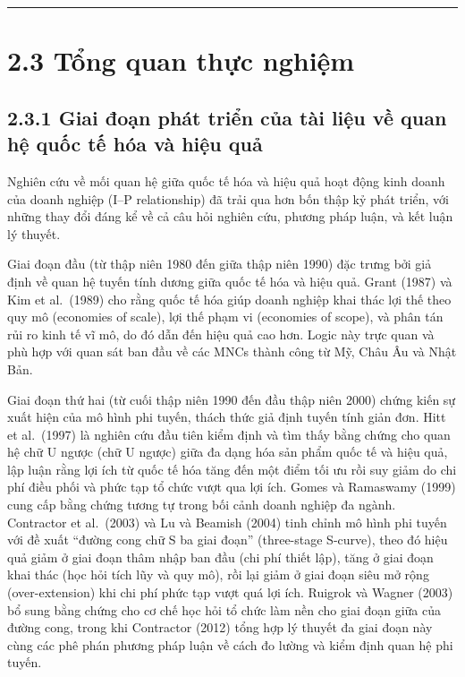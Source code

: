 \documentclass[
  a4paper,
  13pt]{extreport}
\begin{document}
\begin{center}\rule{0.5\linewidth}{0.5pt}\end{center}

\hypertarget{tux1ed5ng-quan-thux1ef1c-nghiux1ec7m}{%
\section{2.3 Tổng quan thực
nghiệm}\label{tux1ed5ng-quan-thux1ef1c-nghiux1ec7m}}

\hypertarget{giai-ux111oux1ea1n-phuxe1t-triux1ec3n-cux1ee7a-tuxe0i-liux1ec7u-vux1ec1-quan-hux1ec7-quux1ed1c-tux1ebf-huxf3a-vuxe0-hiux1ec7u-quux1ea3}{%
\subsection{2.3.1 Giai đoạn phát triển của tài liệu về quan hệ quốc tế
hóa và hiệu
quả}\label{giai-ux111oux1ea1n-phuxe1t-triux1ec3n-cux1ee7a-tuxe0i-liux1ec7u-vux1ec1-quan-hux1ec7-quux1ed1c-tux1ebf-huxf3a-vuxe0-hiux1ec7u-quux1ea3}}

Nghiên cứu về mối quan hệ giữa quốc tế hóa và hiệu quả hoạt động kinh
doanh của doanh nghiệp (I--P relationship) đã trải qua hơn bốn thập kỷ
phát triển, với những thay đổi đáng kể về cả câu hỏi nghiên cứu, phương
pháp luận, và kết luận lý thuyết.

Giai đoạn đầu (từ thập niên 1980 đến giữa thập niên 1990) đặc trưng bởi
giả định về quan hệ tuyến tính dương giữa quốc tế hóa và hiệu quả. Grant
(1987) và Kim et al.~(1989) cho rằng quốc tế hóa giúp doanh nghiệp khai
thác lợi thế theo quy mô (economies of scale), lợi thế phạm vi
(economies of scope), và phân tán rủi ro kinh tế vĩ mô, do đó dẫn đến
hiệu quả cao hơn. Logic này trực quan và phù hợp với quan sát ban đầu về
các MNCs thành công từ Mỹ, Châu Âu và Nhật Bản.

Giai đoạn thứ hai (từ cuối thập niên 1990 đến đầu thập niên 2000) chứng
kiến sự xuất hiện của mô hình phi tuyến, thách thức giả định tuyến tính
giản đơn. Hitt et al.~(1997) là nghiên cứu đầu tiên kiểm định và tìm
thấy bằng chứng cho quan hệ chữ U ngược (chữ U ngược) giữa đa dạng hóa
sản phẩm quốc tế và hiệu quả, lập luận rằng lợi ích từ quốc tế hóa tăng
đến một điểm tối ưu rồi suy giảm do chi phí điều phối và phức tạp tổ
chức vượt qua lợi ích. Gomes và Ramaswamy (1999) cung cấp bằng chứng
tương tự trong bối cảnh doanh nghiệp đa ngành. Contractor et al.~(2003)
và Lu và Beamish (2004) tinh chỉnh mô hình phi tuyến với đề xuất ``đường
cong chữ S ba giai đoạn'' (three-stage S-curve), theo đó hiệu quả giảm ở
giai đoạn thâm nhập ban đầu (chi phí thiết lập), tăng ở giai đoạn khai
thác (học hỏi tích lũy và quy mô), rồi lại giảm ở giai đoạn siêu mở rộng
(over-extension) khi chi phí phức tạp vượt quá lợi ích. Ruigrok và
Wagner (2003) bổ sung bằng chứng cho cơ chế học hỏi tổ chức làm nền cho
giai đoạn giữa của đường cong, trong khi Contractor (2012) tổng hợp lý
thuyết đa giai đoạn này cùng các phê phán phương pháp luận về cách đo
lường và kiểm định quan hệ phi tuyến.
\end{document}
